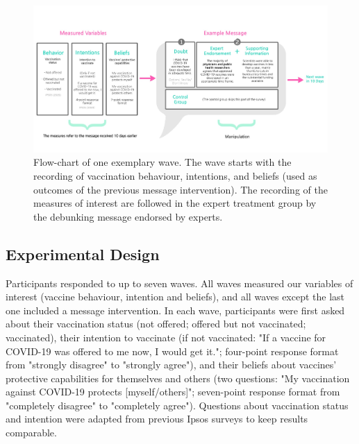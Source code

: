 \documentclass[authordate, empirical]{jote-new-article}
\begin{document}
\begin{figure}[bh!]
  \begin{fullwidth}
    \includegraphics[width=\linewidth]{media/image1.jpg}

    \caption{Flow-chart of one exemplary wave. The wave starts with the recording of vaccination behaviour, intentions, and beliefs (used as outcomes of the previous message intervention). The recording of the measures of interest are followed in the expert treatment group by the debunking message endorsed by experts.}

    \label{fig:rId9}

  \end{fullwidth}
\end{figure}




\subsection{Experimental Design}

Participants responded to up to seven waves. All waves measured our variables of interest (vaccine behaviour, intention and beliefs), and all waves except the last one included a message intervention. In each wave, participants were first asked about their vaccination status (not offered; offered but not vaccinated; vaccinated), their intention to vaccinate (if not vaccinated: "If a vaccine for COVID-19 was offered to me now, I would get it."; four-point response format from "strongly disagree" to "strongly agree"), and their beliefs about vaccines' protective capabilities for themselves and others (two questions: "My vaccination against COVID-19 protects [myself/others]"; seven-point response format from "completely disagree" to "completely agree"). Questions about vaccination status and intention were adapted from previous Ipsos surveys \parencites{Boyon2021} to keep results comparable.
\end{document}
